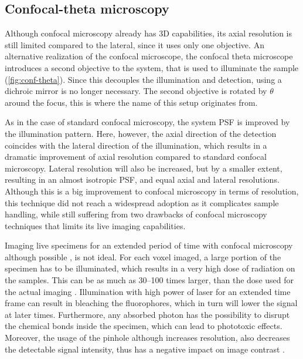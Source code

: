   \subsection{Confocal-theta microscopy}

    Although confocal microscopy already has 3D capabilities, its axial resolution is still limited compared to the lateral, since it uses only one objective. An alternative realization of the confocal microscope, the confocal theta microscope \cite{stelzer_fundamental_1994} introduces a second objective to the system, that is used to illuminate the sample (\autoref{fig:conf-theta}). Since this decouples the illumination and detection, using a dichroic mirror is no longer necessary. The second objective is rotated by $\theta$ around the focus, this is where the name of this setup originates from.

    As in the case of standard confocal microscopy, the system PSF is improved by the illumination pattern. Here, however, the axial direction of the detection coincides with the lateral direction of the illumination, which results in a dramatic improvement of axial resolution compared to standard confocal microscopy. Lateral resolution will also be increased, but by a smaller extent, resulting in an almost isotropic PSF, and equal axial and lateral resolutions.%
    Although this is a big improvement to confocal microscopy in terms of resolution, this technique did not reach a widespread adoption as it complicates sample handling, while still suffering from two drawbacks of confocal microscopy techniques that limits its live imaging capabilities.

    Imaging live specimens for an extended period of time with confocal microscopy although possible \cite{aldaz_live_2010, maitre_asymmetric_2016}, is not ideal. For each voxel imaged, a large portion of the specimen has to be illuminated, which results in a very high dose of radiation on the samples. This can be as much as 30--100 times larger, than the dose used for the actual imaging \cite{reynaud_light_2008}. Illumination with high power of laser for an extended time frame can result in bleaching the fluorophores, which in turn will lower the signal at later times. Furthermore, any absorbed photon has the possibility to disrupt the chemical bonds inside the specimen, which can lead to phototoxic effects. Moreover, the usage of the pinhole although increases resolution, also decreases the detectable signal intensity, thus has a negative impact on image contrast \cite{stelzer_contrast_1998}.

